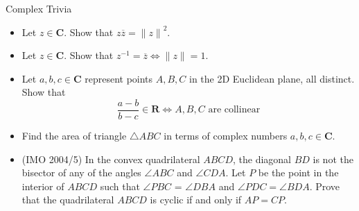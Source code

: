 \documentclass[12pt,letterpaper]{article}
\begin{document}
\begin{problem}{Complex Trivia}
  \begin{itemize}
    \item Let \(z\in\mathbf{C}\). Show that \(z\overline{z} = {\|z\|}^2\).
    \item Let \(z\in\mathbf{C}\). Show that \({z}^{-1} = \overline{z} \iff
    \|z\| = 1\).
    \item Let \(a, b, c\in\mathbf{C}\) represent points \(A, B, C\) in the 2D
    Euclidean plane, all distinct. Show that \[
      \frac{a-b}{b-c} \in \mathbf{R} \iff A, B, C\text{ are collinear}
    \]
    \item Find the area of triangle \(\triangle ABC\) in terms of complex
    numbers \(a, b, c\in\mathbf{C}\).
    \item (IMO 2004/5) In the convex quadrilateral \(ABCD\), the diagonal
    \(BD\) is not the bisector of any of the angles \(\angle ABC\) and \(\angle
    CDA\). Let \(P\) be the point in the interior of \(ABCD\) such that
    \(\angle PBC\) = \(\angle DBA\) and \(\angle PDC = \angle BDA\). Prove that
    the quadrilateral \(ABCD\) is cyclic if and only if \(AP = CP\).
  \end{itemize}
\end{problem}
\end{document}
